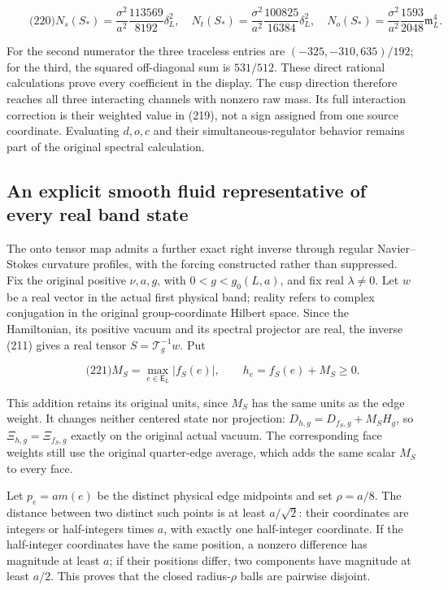 \[
\qquad\text{(220)}
 N_s(S_*)=\frac{\sigma^2}{a^2}\frac{113569}{8192}\delta_L^2,
 \quad N_t(S_*)=\frac{\sigma^2}{a^2}\frac{100825}{16384}\delta_L^2,
 \quad N_o(S_*)=\frac{\sigma^2}{a^2}\frac{1593}{2048}\mathfrak m_L^4.
\]

For the second numerator the three traceless entries are
\((-325,-310,635)/192\); for the third, the squared off-diagonal sum is
\(531/512\). These direct rational calculations prove every coefficient
in the display. The cusp direction therefore reaches all three
interacting channels with nonzero raw mass. Its full interaction
correction is their weighted value in (219), not a sign assigned from
one source coordinate. Evaluating \(d,o,c\) and their
simultaneous-regulator behavior remains part of the original spectral
calculation.

\subsection{An explicit smooth fluid representative of every real band
state}\label{interacting-tensor-band-md-an-explicit-smooth-fluid-representative-of-every-real-band-state}

The onto tensor map admits a further exact right inverse through regular
Navier--Stokes curvature profiles, with the forcing constructed rather
than suppressed. Fix the original positive \(\nu,a,g\), with
\(0<g<g_0(L,a)\), and fix real \(\lambda\ne0\). Let \(w\) be a real
vector in the actual first physical band; reality refers to complex
conjugation in the original group-coordinate Hilbert space. Since the
Hamiltonian, its positive vacuum and its spectral projector are real,
the inverse (211) gives a real tensor \(S=\mathcal T_g^{-1}w\). Put

\[
\qquad\text{(221)}
 M_S=\max_{e\in\mathsf E_L}|f_S(e)|,\qquad h_e=f_S(e)+M_S\ge0.
\]

This addition retains its original units, since \(M_S\) has the same
units as the edge weight. It changes neither centered state nor
projection: \(D_{h,g}=D_{f_S,g}+M_SH_g\), so \(\Xi_{h,g}=\Xi_{f_S,g}\)
exactly on the original actual vacuum. The corresponding face weights
still use the original quarter-edge average, which adds the same scalar
\(M_S\) to every face.

Let \(p_e=a m(e)\) be the distinct physical edge midpoints and set
\(\rho=a/8\). The distance between two distinct such points is at least
\(a/\sqrt2\): their coordinates are integers or half-integers times
\(a\), with exactly one half-integer coordinate. If the half-integer
coordinates have the same position, a nonzero difference has magnitude
at least \(a\); if their positions differ, two components have magnitude
at least \(a/2\). This proves that the closed radius-\(\rho\) balls are
pairwise disjoint.

